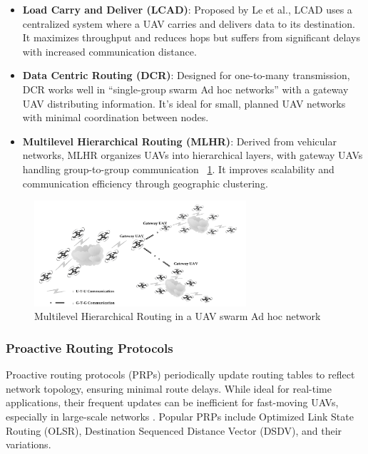 \begin{itemize}
    \item \textbf{Load Carry and Deliver (LCAD)}: Proposed by Le et al., LCAD uses a centralized system where a UAV carries and delivers data to its destination. It maximizes throughput and reduces hops but suffers from significant delays with increased communication distance.
    
    \item \textbf{Data Centric Routing (DCR)}: Designed for one-to-many transmission, DCR works well in “single-group swarm Ad hoc networks” with a gateway UAV distributing information. It’s ideal for small, planned UAV networks with minimal coordination between nodes.
    
    \item \textbf{Multilevel Hierarchical Routing (MLHR)}: Derived from vehicular networks, MLHR organizes UAVs into hierarchical layers, with gateway UAVs handling group-to-group communication ~\ref{fig:Multilevel Hierarchical Routing in a UAV swarm Ad hoc network}. It improves scalability and communication efficiency through geographic clustering.
\end{itemize}


\begin{figure}[ht]
\centering
\includegraphics[width=0.7\textwidth]{Figures/Chapter1/Section6/3.png}
\caption{Multilevel Hierarchical Routing in a UAV swarm Ad hoc network}
\label{fig:Multilevel Hierarchical Routing in a UAV swarm Ad hoc network}
\end{figure}


\subsubsection{Proactive Routing Protocols}


Proactive routing protocols (PRPs) periodically update routing tables to reflect network topology, ensuring minimal route delays. While ideal for real-time applications, their frequent updates can be inefficient for fast-moving UAVs, especially in large-scale networks \cite{Chen2020}. Popular PRPs include Optimized Link State Routing (OLSR), Destination Sequenced Distance Vector (DSDV), and their variations.

